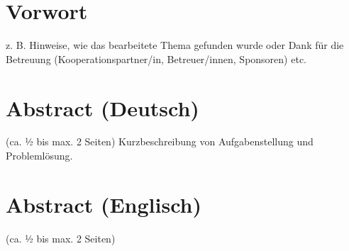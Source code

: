 \chapter*{Vorwort}
z. B. Hinweise, wie das bearbeitete Thema gefunden wurde oder Dank für die Betreuung (Kooperationspartner/in, Betreuer/innen, Sponsoren) etc.


\chapter*{Abstract (Deutsch)}
 (ca. ½ bis max. 2 Seiten)
Kurzbeschreibung von Aufgabenstellung und Problemlösung.

\chapter*{Abstract (Englisch)}
 (ca. ½ bis max. 2 Seiten)